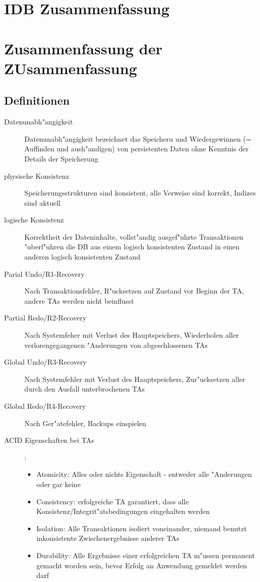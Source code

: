 \documentclass[a4paper, 12pt]{scrartcl}
\begin{document}
\section*{IDB Zusammenfassung}
\tableofcontents

\newpage

\section{Zusammenfassung der ZUsammenfassung}
\subsection{Definitionen}
\begin{description}
	\item[Datenunabh"angigkeit] Datenunabh"angigkeit bezeichnet das Speicheru und Wiedergewinnen (= Auffinden und aush"andigen) von persistenten Daten ohne Kenntnis der Details der Speicherung
	\item[physische Konsistenz] Speicherungsstrukturen sind konsistent, alle Verweise sind korrekt, Indizes sind aktuell
	\item[logische Konsistenz] Korrektheit der Dateninhalte, vollst"andig ausgef"uhrte Transaktionen "uberf"uhren die DB aus einem logisch konsistenten Zustand in einen anderen logisch konsistenten Zustand
	\item
		[Parial Undo/R1-Recovery] Nach Transaktionsfehler, R"ucksetzen auf Zustand vor Beginn der TA, andere TAs werden nicht beinflusst
	\item
		[Partial Redo/R2-Recovery] Nach Systemfeher mit Verlust des Hauptspeichers, Wiederholen aller verlorengegangenen "Anderungen von abgeschlossenen TAs
	\item
		[Global Undo/R3-Recovery] Nach Systemfehler mit Verlust des Hauptspeichers, Zur"ucksetzen aller durch den Ausfall unterbrochenen TAs
	\item
		[Global Redo/R4-Recovery] Nach Ger"atefehler, Backups einspielen
	\item
		[ACID Eigenschaften bei TAs]:
		\begin{itemize}
			\item Atomicity: Alles oder nichts Eigenschaft - entweder alle "Anderungen oder gar keine
			\item Consistency: erfolgreiche TA garantiert, dass alle Konsistenz/Integrit"atsbedingungen eingehalten werden
			\item
				 Isolation: Alle Transaktionen isoliert voneinander, niemand benutzt inkonsistente Zwischenergebnisse anderer TAs
			\item
				 Durability: Alle Ergebnisse einer erfolgreichen TA m"ussen permanent gemacht worden sein, bevor Erfolg an Anwendung gemeldet werden darf
		\end{itemize}


\end{description}
\end{document}
